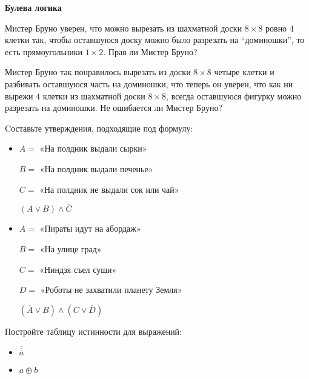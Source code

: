 \documentclass{article}
\begin{document}
    \large


    \begin{center}
        \textbf{Булева логика}
    \end{center}

    \begin{enumerate_boxed}

        \item Мистер Бруно уверен, что можно вырезать из шахматной доски $8 \times 8$ ровно $4$ клетки так, чтобы оставшуюся доску можно было разрезать на “доминошки”, то есть прямоугольники $1 \times 2$.
        Прав ли Мистер Бруно?

        \item Мистер Бруно так понравилось вырезать из доски $8 \times 8$ четыре клетки и разбивать оставшуюся часть на доминошки, что теперь он уверен, что как ни вырежи $4$ клетки из шахматной доски $8 \times 8$, всегда оставшуюся фигурку можно разрезать на доминошки.
        Не ошибается ли Мистер Бруно?

        \item Cоставьте утверждения, подходящие под формулу:
        \begin{itemize}
            \item
            $A =$ «На полдник выдали сырки»

            $B =$ «На полдник выдали печенье»

            $C =$ «На полдник не выдали сок или чай»

            $(A\vee B)\wedge \overline{C}$

            \item
            $A =$ «Пираты идут на абордаж»

            $B =$ «На улице град»

            $C =$ «Ниндзя съел суши»

            $D =$ «Роботы не захватили планету Земля»

            $(\overline{A}\vee B)\wedge (C \vee \overline{D})$

        \end{itemize}

        \item Постройте таблицу истинности для выражений:
        \begin{itemize}

            \item $\overline{\overline{\overline{a}}}$

            \item $a \oplus b$


\end{itemize}
\end{enumerate_boxed}
\end{document}
